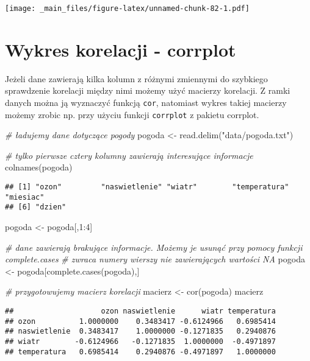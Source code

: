 \documentclass[
]{book}
\newenvironment{Shaded}{\begin{snugshade}}{\end{snugshade}}
\newcommand{\CommentTok}[1]{\textcolor[rgb]{0.56,0.35,0.01}{\textit{#1}}}
\newcommand{\DecValTok}[1]{\textcolor[rgb]{0.00,0.00,0.81}{#1}}
\newcommand{\FunctionTok}[1]{\textcolor[rgb]{0.00,0.00,0.00}{#1}}
\newcommand{\NormalTok}[1]{#1}
\newcommand{\OtherTok}[1]{\textcolor[rgb]{0.56,0.35,0.01}{#1}}
\newcommand{\SpecialCharTok}[1]{\textcolor[rgb]{0.00,0.00,0.00}{#1}}
\newcommand{\StringTok}[1]{\textcolor[rgb]{0.31,0.60,0.02}{#1}}
\begin{document}
\texttt{[image: \_main\_files/figure-latex/unnamed-chunk-82-1.pdf]}

\hypertarget{wykres-korelacji---corrplot}{%
\section{Wykres korelacji - corrplot}\label{wykres-korelacji---corrplot}}

Jeżeli dane zawierają kilka kolumn z różnymi zmiennymi do szybkiego sprawdzenie korelacji między nimi możemy użyć macierzy korelacji. Z ramki danych można ją wyznaczyć funkcją \texttt{cor}, natomiast wykres takiej macierzy możemy zrobic np. przy użyciu funkcji \texttt{corrplot} z pakietu corrplot.

\begin{Shaded}
\begin{Highlighting}[]
\CommentTok{\# ładujemy dane dotyczące pogody}
\NormalTok{pogoda }\OtherTok{\textless{}{-}} \FunctionTok{read.delim}\NormalTok{(}\StringTok{"data/pogoda.txt"}\NormalTok{)}

\CommentTok{\# tylko pierwsze cztery kolumny zawierają interesujące informacje}
\FunctionTok{colnames}\NormalTok{(pogoda)}
\end{Highlighting}
\end{Shaded}

\begin{verbatim}
## [1] "ozon"         "naswietlenie" "wiatr"        "temperatura"  "miesiac"     
## [6] "dzien"
\end{verbatim}

\begin{Shaded}
\begin{Highlighting}[]
\NormalTok{pogoda }\OtherTok{\textless{}{-}}\NormalTok{ pogoda[,}\DecValTok{1}\SpecialCharTok{:}\DecValTok{4}\NormalTok{]}

\CommentTok{\# dane zawierają brakujące informacje. Możemy je usunąć przy pomocy funkcji complete.cases}
\CommentTok{\# zwraca numery wierszy nie zawierających wartości NA}
\NormalTok{pogoda }\OtherTok{\textless{}{-}}\NormalTok{ pogoda[}\FunctionTok{complete.cases}\NormalTok{(pogoda),]}

\CommentTok{\# przygotowujemy macierz korelacji}
\NormalTok{macierz }\OtherTok{\textless{}{-}} \FunctionTok{cor}\NormalTok{(pogoda)}
\NormalTok{macierz}
\end{Highlighting}
\end{Shaded}

\begin{verbatim}
##                    ozon naswietlenie      wiatr temperatura
## ozon          1.0000000    0.3483417 -0.6124966   0.6985414
## naswietlenie  0.3483417    1.0000000 -0.1271835   0.2940876
## wiatr        -0.6124966   -0.1271835  1.0000000  -0.4971897
## temperatura   0.6985414    0.2940876 -0.4971897   1.0000000
\end{verbatim}
\end{document}

